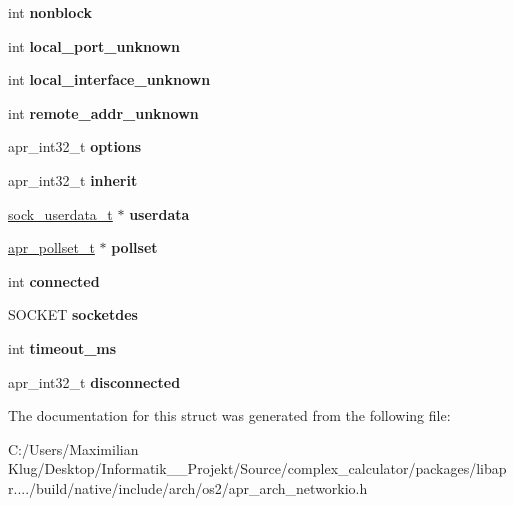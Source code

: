 \begin{DoxyCompactItemize}
int {\bfseries nonblock}
\item 
\mbox{\label{structapr__socket__t_a26fff6df2c70dd6cfa2514ca233cfbbf}} 
int {\bfseries local\+\_\+port\+\_\+unknown}
\item 
\mbox{\label{structapr__socket__t_a3e468f713040ca13ba88d659b6e26fb5}} 
int {\bfseries local\+\_\+interface\+\_\+unknown}
\item 
\mbox{\label{structapr__socket__t_ae9f799c8f438814bfbf0d66265d4ac0d}} 
int {\bfseries remote\+\_\+addr\+\_\+unknown}
\item 
\mbox{\label{structapr__socket__t_a84cff6f5374094c92de81474b88256bf}} 
apr\+\_\+int32\+\_\+t {\bfseries options}
\item 
\mbox{\label{structapr__socket__t_a8f4642ce10b44de6c8a456e1dd18339e}} 
apr\+\_\+int32\+\_\+t {\bfseries inherit}
\item 
\mbox{\label{structapr__socket__t_a235046207ad5817e1eab0ab69157cdbd}} 
\mbox{\hyperlink{structsock__userdata__t}{sock\+\_\+userdata\+\_\+t}} $\ast$ {\bfseries userdata}
\item 
\mbox{\label{structapr__socket__t_a74ca8b549f70ac9d926afd5ae76b159a}} 
\mbox{\hyperlink{structapr__pollset__t}{apr\+\_\+pollset\+\_\+t}} $\ast$ {\bfseries pollset}
\item 
\mbox{\label{structapr__socket__t_aaabc9c7797795005b959eec643b6f141}} 
int {\bfseries connected}
\item 
\mbox{\label{structapr__socket__t_ad549b4fbac0639e44e5e9c7bdd6777fc}} 
S\+O\+C\+K\+ET {\bfseries socketdes}
\item 
\mbox{\label{structapr__socket__t_a5f96324543cdbdb64754049b92fd6533}} 
int {\bfseries timeout\+\_\+ms}
\item 
\mbox{\label{structapr__socket__t_a39ba0837967359dd7e5e87beb9276039}} 
apr\+\_\+int32\+\_\+t {\bfseries disconnected}
\end{DoxyCompactItemize}


The documentation for this struct was generated from the following file\+:\begin{DoxyCompactItemize}
\item 
C\+:/\+Users/\+Maximilian Klug/\+Desktop/\+Informatik\+\_\+\_\+\+Projekt/\+Source/complex\+\_\+calculator/packages/libapr..../build/native/include/arch/os2/apr\+\_\+arch\+\_\+networkio.\+h\end{DoxyCompactItemize}
